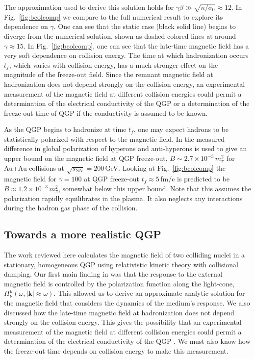 The approximation used to derive this solution holds for $\gamma\beta \gg \sqrt{ \kappa/\sigma_0} \approx 12$. In Fig.~\ref{fig:bcolcomp} we compare  to the full numerical result to explore its dependence on $\gamma$.  One can see that the static case  (black solid line) begins to diverge from the numerical solution, shown as dashed colored lines at around $\gamma \approx 15$.  In Fig.~\ref{fig:bcolcomp}, one can see that the late-time magnetic field has a very soft dependence on collision energy. The time at which hadronization occurs $t_f$, which varies with collision energy, has a much stronger effect on the magnitude of the freeze-out field. Since the remnant magnetic field at hadronization does not depend strongly on the collision energy, an experimental measurement of the magnetic field at different collision energies could permit a determination of the electrical conductivity of the QGP or a determination of the freeze-out time of QGP if the conductivity is assumed to be known. 

As the QGP begins to hadronize at time $t_f$, one may expect hadrons to be statistically polarized with respect to the magnetic field. In \cite{Muller:2018ibh} the measured difference in global polarization of hyperons and anti-hyperons is used to give an upper bound on the magnetic field at QGP freeze-out, $B \sim 2.7\times 10^{-3}\,m_{\pi}^2$ for Au+Au collisions at $\sqrt{s_\text{NN}} = 200$\,GeV. Looking at Fig.~\ref{fig:bcolcomp} the magnetic field for $\gamma = 100$ at QGP freeze-out $t_f \approx 5 $\,fm/c is predicted to be $B \approx 1.2\times 10^{-3}\,m_{\pi}^2$, somewhat below this upper bound. Note that this assumes the polarization rapidly equilibrates in the plasma. It also neglects any interactions during the hadron gas phase of the collision. 

\subsection{Towards a more realistic QGP }\label{sec:ConclusionsQGP}
The work reviewed here calculates the magnetic field of two colliding nuclei in a stationary, homogeneous QGP using relativistic kinetic theory with collisional damping. Our first main finding in \cite{Grayson:2022asf} was that the response to the external magnetic field is controlled by the polarization function along the light-cone, $\Pi^\mu_\nu(\omega ,|\boldsymbol{k}|\approx\omega)$. This allowed us to derive an approximate analytic solution for the magnetic field that considers the dynamics of the medium's response. We also discussed how the late-time magnetic field at hadronization does not depend strongly on the collision energy. This gives the possibility that an experimental measurement of the magnetic field at different collision energies could permit a determination of the electrical conductivity of the QGP \cite{STAR:2023jdd}. We must also know how the freeze-out time depends on collision energy to make this measurement.

